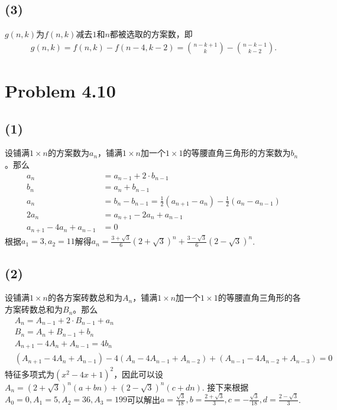 \documentclass{article}
\begin{document}
\subsection*{(3)}
$g(n, k)$为$f(n, k)$减去$1$和$n$都被选取的方案数，即
\begin{align*}
    g(n, k) = f(n, k) - f(n-4, k-2) = \binom{n-k+1}{k} - \binom{n-k-1}{k-2}.
\end{align*}

\section*{Problem 4.10}
\subsection*{(1)}
设铺满$1\times n$的方案数为$a_n$，铺满$1\times n$加一个$1\times 1$的等腰直角三角形的方案数为$b_n$。那么
\begin{align*}
    a_n &= a_{n-1} + 2\cdot b_{n-1}\\
    b_n &= a_n + b_{n-1}\\
    a_n &= b_n - b_{n-1} = \frac{1}{2}(a_{n+1} - a_n) - \frac{1}{2}(a_n - a_{n-1})\\
    2a_n &= a_{n+1} - 2a_n + a_{n-1}\\
    a_{n+1} - 4a_n + a_{n-1} &= 0
\end{align*}
根据$a_1 = 3, a_2 = 11$解得$a_n = \frac{3+\sqrt{3}}{6}(2+\sqrt{3})^n + \frac{3-\sqrt{3}}{6}(2-\sqrt{3})^n$.

\subsection*{(2)}
设铺满$1\times n$的各方案砖数总和为$A_n$，铺满$1\times n$加一个$1\times 1$的等腰直角三角形的各方案砖数总和为$B_n$。那么
\begin{align*}
    &A_n = A_{n-1} + 2\cdot B_{n-1} + a_n\\
    &B_n = A_n + B_{n-1} + b_n\\
    &A_{n+1} - 4A_n + A_{n-1} = 4b_n\\
    &(A_{n+1} - 4A_n + A_{n-1}) - 4(A_{n} - 4A_{n-1} + A_{n-2}) + (A_{n-1} - 4A_{n-2} + A_{n-3}) = 0
\end{align*}
特征多项式为$(x^2 - 4x + 1)^2$，因此可以设
$A_n = (2+\sqrt{3})^n(a+bn) + (2-\sqrt{3})^n(c+dn)$.
接下来根据$A_0 = 0, A_1 = 5, A_2 = 36, A_3 = 199$可以解出$a = \frac{\sqrt{3}}{18},b = \frac{2 + \sqrt{3}}{3},c = -\frac{\sqrt{3}}{18},d = \frac{2 - \sqrt{3}}{3}$.
\end{document}
